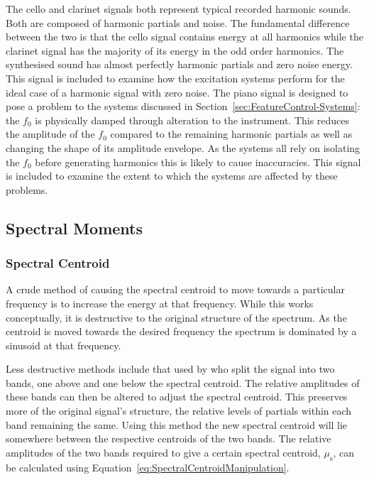 	The cello and clarinet signals both represent typical recorded harmonic sounds. Both are composed of harmonic
	partials and noise. The fundamental difference between the two is that the cello signal contains energy at all
	harmonics while the clarinet signal has the majority of its energy in the odd order harmonics. The synthesised
	sound has almost perfectly harmonic partials and zero noise energy. This signal is included to examine how the
	excitation systems perform for the ideal case of a harmonic signal with zero noise. The piano signal is designed to
	pose a problem to the systems discussed in Section~\ref{sec:FeatureControl-Systems}: the $f_{0}$ is physically
	damped through alteration to the instrument. This reduces the amplitude of the $f_{0}$ compared to the remaining
	harmonic partials as well as changing the shape of its amplitude envelope. As the systems all rely on isolating the
	$f_{0}$ before generating harmonics this is likely to cause inaccuracies. This signal is included to examine the
	extent to which the systems are affected by these problems.

	\subsection{Spectral Moments}
	\label{sec:FeatureControl-Parameterisation-SpectralMoments}
		\subsubsection*{Spectral Centroid}
			A crude method of causing the spectral centroid to move towards a particular frequency is to
			increase the energy at that frequency. While this works conceptually, it is destructive to the
			original structure of the spectrum. As the centroid is moved towards the desired frequency the
			spectrum is dominated by a sinusoid at that frequency.

			Less destructive methods include that used by \citet{zacharakis2011an} who split the signal into
			two bands, one above and one below the spectral centroid. The relative amplitudes of these bands
			can then be altered to adjust the spectral centroid. This preserves more of the original signal's
			structure, the relative levels of partials within each band remaining the same. Using this method
			the new spectral centroid will lie somewhere between the respective centroids of the two bands. The
			relative amplitudes of the two bands required to give a certain spectral centroid,
			$\mu_{\mathrm{s}}$, can be calculated using Equation~\ref{eq:SpectralCentroidManipulation}.

